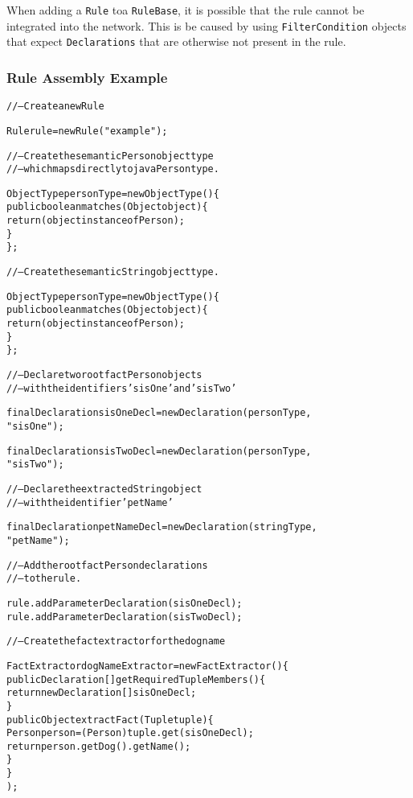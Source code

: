When adding a \verb|Rule| toa  \verb|RuleBase|, it is possible that
the rule cannot be integrated into the network.  This is be caused
by using \verb|FilterCondition| objects that expect
\verb|Declarations| that are otherwise not present in the rule.

\newpage

\subsubsection{Rule Assembly Example}

\footnotesize
\begin{alltt}
// -- Create a new Rule

Rule rule = new Rule("example");

// -- Create the semantic Person object type
// -- which maps directly to java Person type.

ObjectType personType = new ObjectType() \{
        public boolean matches(Object object) \{ 
            return ( object instanceof Person );
        \}
    \};

// -- Create the semantic String object type.

ObjectType personType = new ObjectType() \{
        public boolean matches(Object object) \{ 
            return ( object instanceof Person );
        \}
    \};

// -- Declare two root fact Person objects 
// -- with the identifiers 'sisOne' and 'sisTwo'

final Declaration sisOneDecl = new Declaration( personType,
                                                "sisOne" );

final Declaration sisTwoDecl = new Declaration( personType,
                                                "sisTwo" );

// -- Declare the extracted String object
// -- with the identifier 'petName'

final Declaration petNameDecl = new Declaration( stringType,
                                                 "petName" );

// -- Add the root fact Person declarations
// -- to the rule.

rule.addParameterDeclaration( sisOneDecl );
rule.addParameterDeclaration( sisTwoDecl );


// -- Create the fact extractor for the dog name

FactExtractor dogNameExtractor = new FactExtractor() \{
        public Declaration[] getRequiredTupleMembers() \{
            return new Declaration[] { sisOneDecl };
        \}
        public Object extractFact(Tuple tuple) \{
            Person person = (Person) tuple.get( sisOneDecl );
            return person.getDog().getName();
        \}
    \}
      );


\end{alltt}
